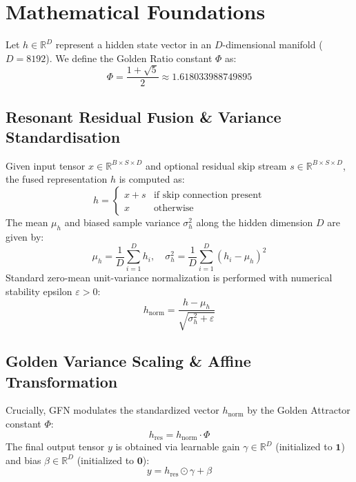 \section{Mathematical Foundations}
Let $h \in \mathbb{R}^D$ represent a hidden state vector in an $D$-dimensional manifold ($D=8192$). We define the Golden Ratio constant $\Phi$ as:
\begin{equation}
    \Phi = \frac{1 + \sqrt{5}}{2} \approx 1.618033988749895
\end{equation}

\subsection{Resonant Residual Fusion \& Variance Standardisation}
Given input tensor $x \in \mathbb{R}^{B \times S \times D}$ and optional residual skip stream $s \in \mathbb{R}^{B \times S \times D}$, the fused representation $h$ is computed as:
\begin{equation}
    h = \begin{cases} x + s & \text{if skip connection present} \\ x & \text{otherwise} \end{cases}
\end{equation}
The mean $\mu_h$ and biased sample variance $\sigma_h^2$ along the hidden dimension $D$ are given by:
\begin{equation}
    \mu_h = \frac{1}{D} \sum_{i=1}^D h_i, \quad \sigma_h^2 = \frac{1}{D} \sum_{i=1}^D (h_i - \mu_h)^2
\end{equation}
Standard zero-mean unit-variance normalization is performed with numerical stability epsilon $\varepsilon > 0$:
\begin{equation}
    h_{\text{norm}} = \frac{h - \mu_h}{\sqrt{\sigma_h^2 + \varepsilon}}
\end{equation}

\subsection{Golden Variance Scaling \& Affine Transformation}
Crucially, GFN modulates the standardized vector $h_{\text{norm}}$ by the Golden Attractor constant $\Phi$:
\begin{equation}
    h_{\text{res}} = h_{\text{norm}} \cdot \Phi
\end{equation}
The final output tensor $y$ is obtained via learnable gain $\gamma \in \mathbb{R}^D$ (initialized to $\mathbf{1}$) and bias $\beta \in \mathbb{R}^D$ (initialized to $\mathbf{0}$):
\begin{equation}
    y = h_{\text{res}} \odot \gamma + \beta
\end{equation}

